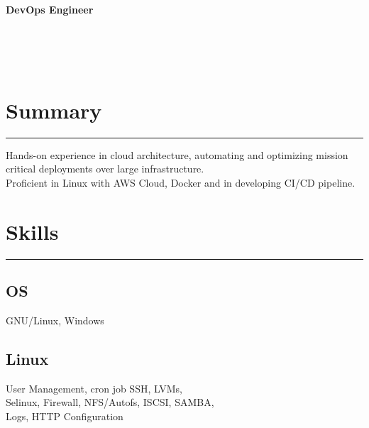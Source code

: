\documentclass[]{rahulworld-resume}
\begin{document}
%
%

\begin{minipage}[t]{0.33\textwidth} 
\begin{Huge}
	\\
\end{Huge}
\begin{LARGE}
	\textbf{\\DevOps Engineer}
\end{LARGE}
\hspace*{0pt}\hfill    \\
\hspace*{0pt}\hfill    \\
\hspace*{0pt}\hfill    \\
\section[14pt]{Summary} 
\noindent\rule{5cm}{0.4pt}
\begin{large}
Hands-on experience in cloud architecture, automating and optimizing mission critical deployments over large infrastructure.\\
Proficient in Linux with AWS Cloud, Docker and in developing CI/CD pipeline.
\end{large}

\sectionsep
\section{Skills}
\noindent\rule{5cm}{0.4pt}
\subsection{OS}
GNU/Linux, Windows
\vspace{6pt}

\vspace{6pt}
\subsection{Linux}
User Management, cron job SSH, LVMs, \\ Selinux, Firewall, NFS/Autofs, ISCSI, SAMBA, \\Logs, HTTP Configuration


\end{minipage}
\end{document}
